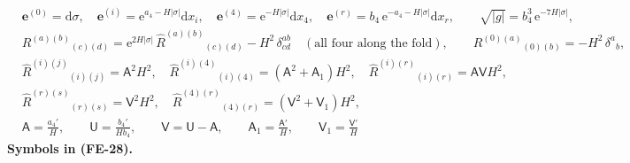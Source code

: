 \documentclass[
  10pt,
]{article}
\begin{document}
\[
\begin{aligned}
&\mathbf{e}^{(0)} = \mathrm{d}\sigma,\quad \mathbf{e}^{(i)} = \mathrm{e}^{a_4 - H\lvert\sigma\rvert}\mathrm{d}x_i,\quad
 \mathbf{e}^{(4)} = \mathrm{e}^{-H\lvert\sigma\rvert}\mathrm{d}x_4,\quad \mathbf{e}^{(r)} = b_4\,\mathrm{e}^{-a_4 - H\lvert\sigma\rvert}\mathrm{d}x_r,\qquad
 \sqrt{\lvert g\rvert} = b_4^3\,\mathrm{e}^{-7H\lvert\sigma\rvert},\\
&R^{(a)(b)}{}_{(c)(d)} = \mathrm{e}^{2H\lvert\sigma\rvert}\,\hat R^{(a)(b)}{}_{(c)(d)} - H^2\,\delta^{ab}_{cd}\quad(\text{all four along the fold}),\qquad
 R^{(0)(a)}{}_{(0)(b)} = -H^2\,\delta^a{}_b,\\
&\hat R^{(i)(j)}{}_{(i)(j)} = \mathsf{A}^2H^2,\quad \hat R^{(i)(4)}{}_{(i)(4)} = (\mathsf{A}^2 + \mathsf{A}_1)H^2,\quad
 \hat R^{(i)(r)}{}_{(i)(r)} = \mathsf{A}\mathsf{V}H^2,\\
&\hat R^{(r)(s)}{}_{(r)(s)} = \mathsf{V}^2H^2,\quad
 \hat R^{(4)(r)}{}_{(4)(r)} = (\mathsf{V}^2 + \mathsf{V}_1)H^2,\\
&\mathsf{A} = \frac{a_4'}{H},\qquad \mathsf{U} = \frac{b_4'}{Hb_4},\qquad \mathsf{V} = \mathsf{U} - \mathsf{A},\qquad
 \mathsf{A}_1 = \frac{\mathsf{A}'}{H},\qquad \mathsf{V}_1 = \frac{\mathsf{V}'}{H}
\end{aligned} \tag{FE-28}
\] \textbf{Symbols in (FE-28).}
\end{document}
